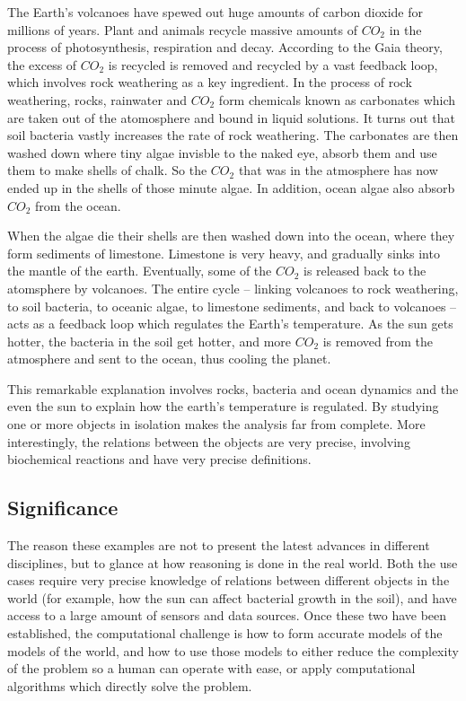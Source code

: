 The Earth's volcanoes have spewed out huge amounts of carbon dioxide for millions of years. Plant and animals recycle massive amounts of $CO_2$ in the process of photosynthesis, respiration and decay. According to the Gaia theory, the excess of $CO_2$ is recycled is removed and recycled by a vast feedback loop, which involves rock weathering as a key ingredient. In the process of rock weathering, rocks, rainwater and $CO_2$ form chemicals known as carbonates which are taken out of the atomosphere and bound in liquid solutions. It turns out that soil bacteria vastly increases the rate of rock weathering. The carbonates are then washed down where tiny algae invisble to the naked eye, absorb them and use them to make shells of chalk. So the $CO_2$ that was in the atmosphere has now ended up in the shells of those minute algae. In addition, ocean algae also absorb $CO_2$ from the ocean.  

When the algae die their shells are then washed down into the ocean, where they form sediments of limestone. Limestone is very heavy, and gradually sinks into the mantle of the earth. Eventually, some of the $CO_2$ is released back to the atomsphere by volcanoes. The entire cycle -- linking volcanoes to rock weathering, to soil bacteria, to oceanic algae, to limestone sediments, and back to volcanoes -- acts as a feedback loop which regulates the Earth's temperature. As the sun gets hotter, the bacteria in the soil get hotter, and more $CO_2$ is removed from the atmosphere and sent to the ocean, thus cooling the planet.

This remarkable explanation involves rocks, bacteria and ocean dynamics and the even the sun to explain how the earth's temperature is regulated. By studying one or more objects in isolation makes the analysis far from complete. More interestingly, the relations between the objects are very precise, involving biochemical reactions and have very precise definitions.

\subsection{Significance}
The reason these examples are not to present the latest advances in different disciplines, but to glance at how reasoning is done in the real world. Both the use cases require very precise knowledge of relations between different objects in the world (for example, how the sun can affect bacterial growth in the soil), and have access to a large amount of sensors and data sources. Once these two have been established, the computational challenge is how to form accurate models of the models of the world, and how to use those models to either reduce the complexity of the problem so a human can operate with ease, or apply computational algorithms which directly solve the problem. 


